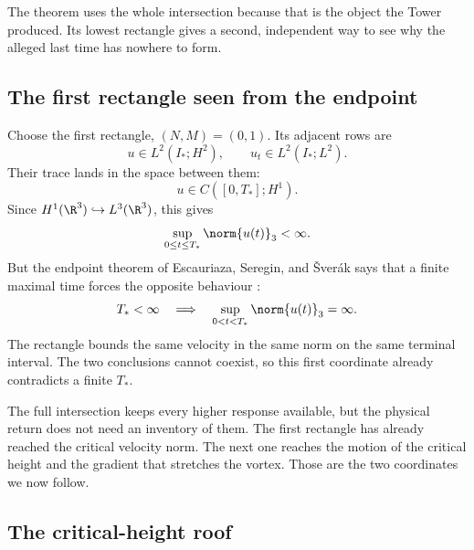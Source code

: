 The theorem uses the whole intersection because that is the object the Tower
produced.  Its lowest rectangle gives a second, independent way to see why the
alleged last time has nowhere to form.

\subsection{The first rectangle seen from the endpoint}\label{sub:FromFiniteRectanglesToClassicalEstimates}

Choose the first rectangle, \((N,M)=(0,1)\).
Its adjacent rows are
\[
  u\in L^2(I_*;H^2),
  \qquad
  u_t\in L^2(I_*;L^2).
\]
Their trace lands in the space between them:
\[
  u\in C([0,T_*];H^1).
\]
Since \(H^1(\R^3)\hookrightarrow L^3(\R^3)\), this gives
\begin{equation}\label{eq:EndpointCriterionFromLowRectangle}
  \sup_{0\leq t\leq T_*}\norm{u(t)}_3<\infty.
\end{equation}
But the endpoint theorem of Escauriaza, Seregin, and \v{S}ver\'ak says that a finite maximal time forces the opposite behaviour \parencite{EscauriazaSereginSverak2003}:
\begin{equation}\label{eq:FiniteTimeLThreeEscape}
  T_*<\infty
  \quad\Longrightarrow\quad
  \sup_{0<t<T_*}\norm{u(t)}_3=\infty.
\end{equation}
The rectangle bounds the same velocity in the same norm on the same terminal interval.
The two conclusions cannot coexist, so this first coordinate already contradicts a finite \(T_*\).

The full intersection keeps every higher response available, but the physical
return does not need an inventory of them.  The first rectangle has already
reached the critical velocity norm.  The next one reaches the motion of the
critical height and the gradient that stretches the vortex.  Those are the two
coordinates we now follow.

\subsection{The critical-height roof}\label{sub:ClassicalContinuationCriteriaInsideFiniteRectangles}

